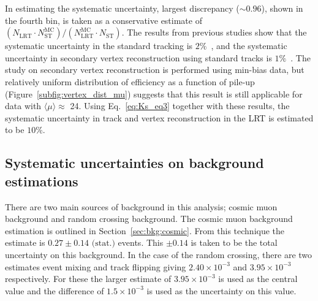 In estimating the systematic uncertainty, largest discrepancy ($\sim0.96$), shown in the fourth bin, is taken as a conservative estimate of $(N_{\mathrm{LRT}} \cdot N_{\mathrm{ST}}^{\mathrm{MC}}) / (N_{\mathrm{LRT}}^{\mathrm{MC}} \cdot N_{\mathrm{ST}})$. The results from previous studies show that the systematic uncertainty in the standard tracking is $2\%$~\cite{ATL-PHYS-PUB-2015-051}, and the systematic uncertainty in secondary vertex reconstruction using standard tracks is $1\%$~\cite{Aaboud:2215485}. The study on secondary vertex reconstruction is performed using min-bias data, but relatively uniform distribution of efficiency as a function of pile-up (Figure~\ref{subfig:vertex_dist_mu}) suggests that this result is still applicable for data with $\langle \mu \rangle\approx$ 24. Using Eq.~\ref{eq:Ks_eq3} together with these results, the systematic uncertainty in track and vertex reconstruction in the LRT is estimated to be $10\%$.


%
%
%

\subsection{Systematic uncertainties on background estimations}
\label{sec:syst_bkg}

There are two main sources of background in this analysis; cosmic muon background and random crossing background. The cosmic muon background estimation is outlined in Section~\ref{sec:bkg:cosmic}. From this technique the estimate is $0.27 \pm 0.14 \textrm{ (stat.)}$ events. This $\pm 0.14$ is taken to be the total uncertainty on this background. In the case of the random crossing, there are two estimates event mixing and track flipping giving $2.40\times10^{-3}$ and $3.95 \times 10^{-3}$ respectively. For these the larger estimate of $3.95 \times 10^{-3}$ is used as the central value and the difference of $1.5\times10^{-3}$ is used as the uncertainty on this value.










